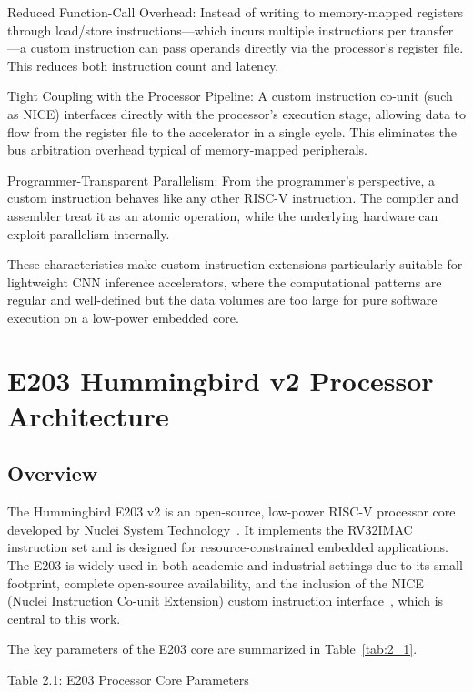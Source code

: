 Reduced Function-Call Overhead: Instead of writing to memory-mapped registers through load/store instructions—which incurs multiple instructions per transfer—a custom instruction can pass operands directly via the processor’s register file. This reduces both instruction count and latency.


Tight Coupling with the Processor Pipeline: A custom instruction co-unit (such as NICE) interfaces directly with the processor’s execution stage, allowing data to flow from the register file to the accelerator in a single cycle. This eliminates the bus arbitration overhead typical of memory-mapped peripherals.


Programmer-Transparent Parallelism: From the programmer’s perspective, a custom instruction behaves like any other RISC-V instruction. The compiler and assembler treat it as an atomic operation, while the underlying hardware can exploit parallelism internally.


These characteristics make custom instruction extensions particularly suitable for lightweight CNN inference accelerators, where the computational patterns are regular and well-defined but the data volumes are too large for pure software execution on a low-power embedded core.


\section{E203 Hummingbird v2 Processor Architecture}\label{sec:2_2}

\subsection{Overview}

The Hummingbird E203 v2 is an open-source, low-power RISC-V processor core developed by Nuclei System Technology~\cite{NUCLEI_E203}. It implements the RV32IMAC instruction set and is designed for resource-constrained embedded applications. The E203 is widely used in both academic and industrial settings due to its small footprint, complete open-source availability, and the inclusion of the NICE (Nuclei Instruction Co-unit Extension) custom instruction interface~\cite{NUCLEI_NICE}, which is central to this work.


The key parameters of the E203 core are summarized in Table~\ref{tab:2_1}.


Table 2.1: E203 Processor Core Parameters


